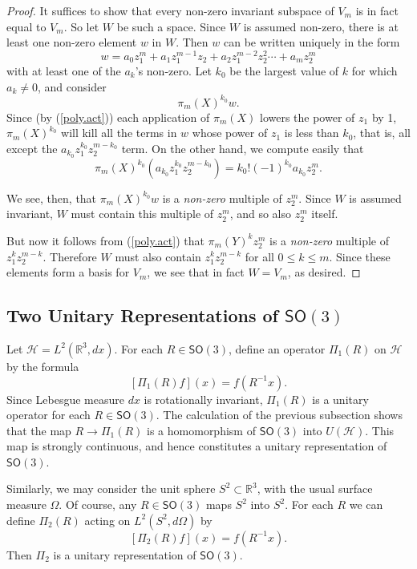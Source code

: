 \documentclass[12pt]{amsbook}
\theoremstyle{plain}
\numberwithin{equation}{chapter}
\numberwithin{theorem}{chapter}
\begin{document}
\begin{proof}
It suffices to show that every non-zero invariant subspace of $V_{m}$ is in
fact equal to $V_{m}$. So let $W$ be such a space. Since $W$ is assumed
non-zero, there is at least one non-zero element $w$ in $W$. Then $w$ can be
written uniquely in the form
\[
w=a_{0}z_{1}^{m}+a_{1}z_{1}^{m-1}z_{2}+a_{2}z_{1}^{m-2}z_{2}^{2}\cdots
+a_{m}z_{2}^{m}%
\]
with at least one of the $a_{k}$'s non-zero. Let $k_{0}$ be the largest value
of $k$ for which $a_{k}\neq0$, and consider
\[
\pi_{m}(X)^{k_{0}}w\text{.}%
\]
Since (by (\ref{poly.act})) each application of $\pi_{m}(X)$ lowers the power
of $z_{1}$ by 1, $\pi_{m}(X)^{k_{0}}$ will kill all the terms in $w$ whose
power of $z_{1}$ is less than $k_{0}$, that is, all except the $a_{k_{0}}%
z_{1}^{k_{0}}z_{2}^{m-k_{0}}$ term. On the other hand, we compute easily that
\[
\pi_{m}(X)^{k_{0}}\left(  a_{k_{0}}z_{1}^{k_{0}}z_{2}^{m-k_{0}}\right)
=k_{0}!(-1)^{k_{0}}a_{k_{0}}z_{2}^{m}\text{.}%
\]

We see, then, that $\pi_{m}(X)^{k_{0}}w$ is a \textit{non-zero} multiple of
$z_{2}^{m}$. Since $W$ is assumed invariant, $W$ must contain this multiple of
$z_{2}^{m}$, and so also $z_{2}^{m}$ itself.

But now it follows from (\ref{poly.act}) that $\pi_{m}(Y)^{k}z_{2}^{m}$ is a
\textit{non-zero} multiple of $z_{1}^{k}z_{2}^{m-k}$. Therefore $W$ must also
contain $z_{1}^{k}z_{2}^{m-k}$ for all $0\leq k\leq m$. Since these elements
form a basis for $V_{m}$, we see that in fact $W=V_{m}$, as desired.
\end{proof}

\subsection{Two Unitary Representations of $\mathsf{SO}(3)$}

Let $\mathcal{H}=L^{2}(\mathbb{R}^{3},dx)$. For each $R\in\mathsf{SO}(3)$,
define an operator $\Pi_{1}(R)$ on $\mathcal{H}$ by the formula
\[
\left[  \Pi_{1}(R)f\right]  (x)=f\left(  R^{-1}x\right)  \text{.}%
\]
Since Lebesgue measure $dx$ is rotationally invariant, $\Pi_{1}(R)$ is a
unitary operator for each $R\in\mathsf{SO}(3)$. The calculation of the
previous subsection shows that the map $R\rightarrow\Pi_{1}(R)$ is a
homomorphism of $\mathsf{SO}(3)$ into $U(\mathcal{H})$. This map is strongly
continuous, and hence constitutes a unitary representation of $\mathsf{SO}(3)
$.

Similarly, we may consider the unit sphere $S^{2}\subset\mathbb{R}^{3}$, with
the usual surface measure $\Omega$. Of course, any $R\in\mathsf{SO}(3)$ maps
$S^{2}$ into $S^{2}$. For each $R$ we can define $\Pi_{2}(R)$ acting on
$L^{2}(S^{2},d\Omega)$ by
\[
\left[  \Pi_{2}(R)f\right]  (x)=f\left(  R^{-1}x\right)  \text{.}%
\]
Then $\Pi_{2}$ is a unitary representation of $\mathsf{SO}(3)$.
\end{document}
